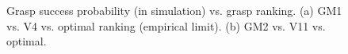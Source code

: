 \begin{figure}[t]
\centering
{}

  \caption{Grasp success probability (in simulation) vs. grasp ranking. (a) GM1 vs. V4 vs. optimal ranking (empirical limit). (b) GM2 vs. V11 vs. optimal.
  \label{fig:successvsranking}}
\end{figure}



